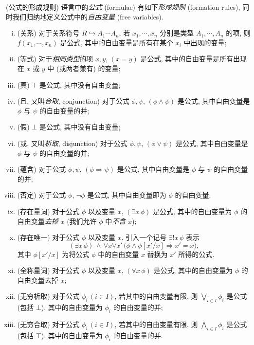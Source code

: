 \begin{definition}
	[label={formula}]
	{(公式的形成规则)}
	语言中的\emph{公式} (formulae) 有如下\emph{形成规则} (formation rules), 同时我们归纳地定义公式中的\emph{自由变量} (free variables).
	\begin{enumerate}[(i)]
		\item (关系) 对于关系符号 $R \hookrightarrow A_1\cdots A_n$, 若 $x_1,\cdots,x_n$ 分别是类型 $A_1,\cdots,A_n$ 的项, 则 $f(x_1,\cdots,x_n)$ 是公式, 其中的自由变量是所有在某个 $x_i$ 中出现的变量;
		\item (等式) 对于\emph{相同类型}的项 $x,y$, $(x=y)$ 是公式, 其中的自由变量是所有出现在 $x$ 或 $y$ 中 (或两者兼有) 的变量;
		\item (真) $\top$ 是公式, 其中没有自由变量;
		\item (且, 又叫\emph{合取}, conjunction) 对于公式 $\phi,\psi$, $(\phi\wedge\psi)$ 是公式, 其中自由变量是 $\phi$ 与 $\psi$ 的自由变量的并;
		\item (假) $\bot$ 是公式, 其中没有自由变量;
		\item (或, 又叫\emph{析取}, disjunction) 对于公式 $\phi,\psi$, $(\phi\vee\psi)$ 是公式, 其中自由变量是 $\phi$ 与 $\psi$ 的自由变量的并;
		\item (蕴含) 对于公式 $\phi,\psi$, $(\phi\Rightarrow \psi)$ 是公式, 其中自由变量是 $\phi$ 与 $\psi$ 的自由变量的并;
		\item (否定) 对于公式 $\phi$, $\neg\phi$ 是公式, 其中自由变量即为 $\phi$ 的自由变量;
		\item (存在量词) 对于公式 $\phi$ 以及变量 $x$, $(\exists x\,\phi)$ 是公式, 其中的自由变量为 $\phi$ 的自由变量\emph{去掉} $x$ (我们允许 $\phi$ 中\emph{不含} $x$);
		\item (存在唯一) 对于公式 $\phi$ 以及变量 $x$, 引入一个记号 $\exists ! x\,\phi$ 表示 $$(\exists x\,\phi) \,\land\, \forall x\forall x'\,\big( \phi \land \phi[x'/x] \Rightarrow x'=x \big),$$
		其中 $\phi[x'/x]$ 为将公式 $\phi$ 中的自由变量 $x$ 替换为 $x'$ 所得的公式.
		\item (全称量词) 对于公式 $\phi$ 以及变量 $x$, $(\forall x\,\phi)$ 是公式, 其中的自由变量为 $\phi$ 的自由变量去掉 $x$;
		\item (无穷析取) 对于公式 $\phi_i\, (i\in I)$, 若其中的自由变量有限, 则 $\bigvee_{i\in I}\phi_i$ 是公式 (包括 $\bot$), 其中的自由变量为 $\phi_i$ 的自由变量的并;
		\item (无穷合取) 对于公式 $\phi_i\, (i\in I)$, 若其中的自由变量有限, 则 $\bigwedge_{i\in I}\phi_i$ 是公式 (包括 $\top$), 其中的自由变量为 $\phi_i$ 的自由变量的并.
	\end{enumerate}
\end{definition}

